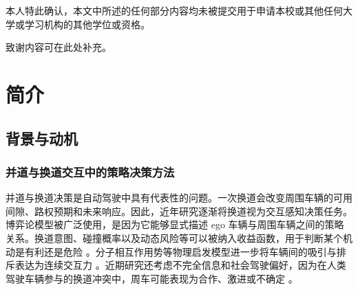 \begin{abstract}
在自动驾驶领域，车辆并道任务一直是一项基本问题。本文提出一种用于自动驾驶车辆并入目标车道的双层决策与控制框架。该方法把并道问题拆分为两个相互耦合但功能清晰的层次：高层模块负责判断目标车道中哪个局部 gap 更值得选择，底层模块负责把被选中的 gap 转换为连续目标点和实际车辆控制输入。高层模块只读取距离 ego 车辆最近的三辆目标车道车辆，由三车形成前后两个候选 gap，通过平滑置信度函数评价二者的相对可行性，并利用带自强化项的意见动力学方程更新高层意见状态。底层模块进一步根据所选 gap 的大小和变化速率计算客观偏置，使用 SAC 强化学习策略确定注意力强度，更新底层意见状态，并把该意见映射为 gap 内的目标控制点。最后，带安全避障项的前轴点跟踪控制器生成车辆加速度和转角变化率。

本文通过在 Python 环境里搭建仿真实验，对控制方法进行了测试，实验结果表明：在单 gap 环境中，SAC 的强化学习方法能较好地学习到策略并保持收敛，车辆也能成功地完成任务；在多 gap 环境中，验证了简单环境学习到的策略在复杂环境下的泛用性，并验证了双层决策系统的有效使用效果。
\end{abstract}
\clearpage

\begin{uomoriginality}
本人特此确认，本文中所述的任何部分内容均未被提交用于申请本校或其他任何大学或学习机构的其他学位或资格。
\end{uomoriginality}
\uomcopyrightstatement

\begin{uomacknowledgements}
致谢内容可在此处补充。
\end{uomacknowledgements}

\uomstartmainbody

\chapter{简介}



\section{背景与动机}



\subsection{并道与换道交互中的策略决策方法}





并道与换道决策是自动驾驶中具有代表性的问题。一次换道会改变周围车辆的可用间隙、路权预期和未来响应。因此，近年研究逐渐将换道视为交互感知决策任务。博弈论模型被广泛使用，是因为它能够显式描述 ego 车辆与周围车辆之间的策略关系。换道意图、碰撞概率以及动态风险等可以被纳入收益函数，用于判断某个机动是有利还是危险 \cite{R1,R2}。分子相互作用势等物理启发模型进一步将车辆间的吸引与排斥表达为连续交互力 \cite{R3}。近期研究还考虑不完全信息和社会驾驶偏好，因为在人类驾驶车辆参与的换道冲突中，周车可能表现为合作、激进或不确定 \cite{R4}。




